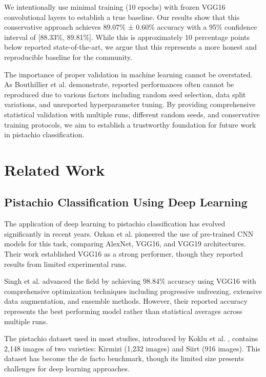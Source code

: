 \documentclass[conference]{IEEEtran}
\begin{document}
We intentionally use minimal training (10 epochs) with frozen VGG16 convolutional layers to establish a true baseline. Our results show that this conservative approach achieves 89.07\% ± 0.60\% accuracy with a 95\% confidence interval of [88.33\%, 89.81\%]. While this is approximately 10 percentage points below reported state-of-the-art, we argue that this represents a more honest and reproducible baseline for the community.

The importance of proper validation in machine learning cannot be overstated. As Bouthillier et al. \cite{bouthillier2019unreproducible} demonstrate, reported performances often cannot be reproduced due to various factors including random seed selection, data split variations, and unreported hyperparameter tuning. By providing comprehensive statistical validation with multiple runs, different random seeds, and conservative training protocols, we aim to establish a trustworthy foundation for future work in pistachio classification.

\section{Related Work}

\subsection{Pistachio Classification Using Deep Learning}

The application of deep learning to pistachio classification has evolved significantly in recent years. Ozkan et al. \cite{ozkan2021classification} pioneered the use of pre-trained CNN models for this task, comparing AlexNet, VGG16, and VGG19 architectures. Their work established VGG16 as a strong performer, though they reported results from limited experimental runs.

Singh et al. \cite{singh2022pistachio} advanced the field by achieving 98.84\% accuracy using VGG16 with comprehensive optimization techniques including progressive unfreezing, extensive data augmentation, and ensemble methods. However, their reported accuracy represents the best performing model rather than statistical averages across multiple runs.

The pistachio dataset used in most studies, introduced by Koklu et al. \cite{koklu2021dataset}, contains 2,148 images of two varieties: Kirmizi (1,232 images) and Siirt (916 images). This dataset has become the de facto benchmark, though its limited size presents challenges for deep learning approaches.
\end{document}
